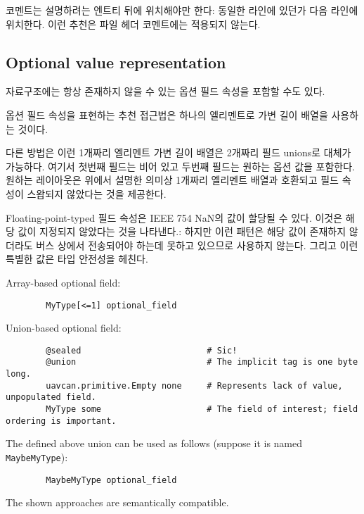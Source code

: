 코멘트는 설명하려는 엔트티 뒤에 위치해야만 한다:
동일한 라인에 있던가 다음 라인에 위치한다.
이런 추천은 파일 헤더 코멘트에는 적용되지 않는다.


\subsection{Optional value representation}

자료구조에는 항상 존재하지 않을 수 있는 옵션 필드 속성을 포함할 수도 있다.

옵션 필드 속성을 표현하는 추천 접근법은 하나의 엘리멘트로 가변 길이 배열을 사용하는 것이다.

다른 방법은 이런 1개짜리 엘리멘트 가변 길이 배열은 2개짜리 필드 unions로 대체가 가능하다. 여기서 첫번째 필드는 비어 있고 두번째 필드는 원하는 옵션 값을 포함한다.
원하는 레이아웃은 위에서 설명한 의미상 1개짜리 엘리멘트 배열과 호환되고 필드 속성이 스왑되지 않았다는 것을 제공한다.

Floating-point-typed 필드 속성은 IEEE 754 NaN의 값이 할당될 수 있다. 이것은 해당 값이 지정되지 않았다는 것을 나타낸다.:
하지만 이런 패턴은 해당 값이 존재하지 않더라도 버스 상에서 전송되어야 하는데 못하고 있으므로 사용하지 않는다. 그리고 이런 특별한 값은 타입 안전성을 헤친다.

\begin{remark}[breakable]
    Array-based optional field:

    \begin{verbatim}
        MyType[<=1] optional_field
    \end{verbatim}

    Union-based optional field:

    \begin{verbatim}
        @sealed                         # Sic!
        @union                          # The implicit tag is one byte long.
        uavcan.primitive.Empty none     # Represents lack of value, unpopulated field.
        MyType some                     # The field of interest; field ordering is important.
    \end{verbatim}

    The defined above union can be used as follows (suppose it is named \verb|MaybeMyType|):

    \begin{verbatim}
        MaybeMyType optional_field
    \end{verbatim}

    The shown approaches are semantically compatible.
\end{remark}

